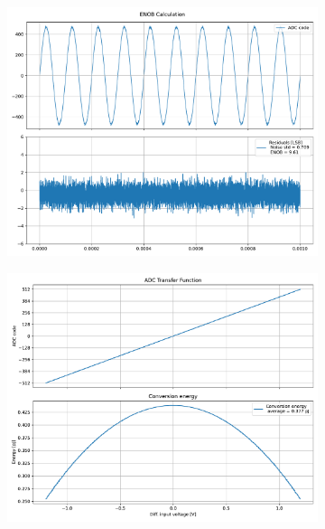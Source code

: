 \documentclass[varwidth]{standalone}
\begin{document}
\begin{figure}
\begin{subfigure}{0.32\textwidth}
    \includegraphics[width=\textwidth]{behavioral_10b_seterror_binrecomb_enob.pdf}
\end{subfigure}
\begin{subfigure}{0.32\textwidth}
    \begin{table}
    \let\center\empty
    \let\endcenter\relax
    \centering
    \resizebox{0.3\width}{!}{}
    \end{table}
    \includegraphics[width=\textwidth]{behavioral_10b_seterror_binrecomb_energy.pdf}
\end{subfigure}
\end{figure}
\end{document}
